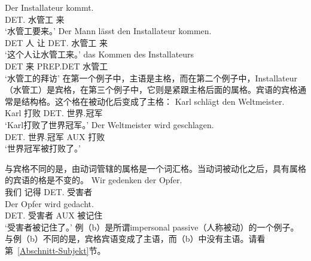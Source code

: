 \eal
\ex 
\gll Der Installateur kommt.\\
	 DET.\nom{} 水管工 来\\
\glt `水管工要来。'
\ex 
\gll Der Mann lässt den Installateur kommen.\\
	 DET 人 让 DET.\acc{} 水管工 来\\
\glt `这个人让水管工来。'
\ex 
\gll das Kommen des Installateurs\\
	 DET 来 PREP.DET 水管工\\
\glt `水管工的拜访'
\zl
在第一个例子中，主语是主格，而在第二个例子中，Installateur（水管工）是宾格，在第三个例子中，它则是紧跟主格后面的属格。宾语的宾格通常是结构格。这个格在被动化后变成了主格：
\eal
\ex 
\gll Karl schlägt den Weltmeister.\\
     Karl 打败 DET.\acc{} 世界.冠军\\
\glt `Karl打败了世界冠军。'
\ex 
\gll Der Weltmeister wird geschlagen.\\
	 DET.\nom{} 世界.冠军 AUX 打败\\
\glt `世界冠军被打败了。'
\zl

\noindent
与宾格不同的是，由动词管辖的属格是一个词汇格。当动词被动化之后，具有属格的宾语的格是不变的。
\eal
\ex
\gll Wir gedenken der Opfer.\\
     我们 记得 DET.\gen{} 受害者\\
\ex 
\gll Der Opfer wird gedacht.\\
	 DET.\gen{} 受害者 AUX 被记住\\
\glt `受害者被记住了。'
\zl
例（b）是所谓impersonal passive（人称被动）的一个例子。与例（b）不同的是，宾格宾语变成了主语，而（b）中没有主语。请看第~\ref{Abschnitt-Subjekt}节。

